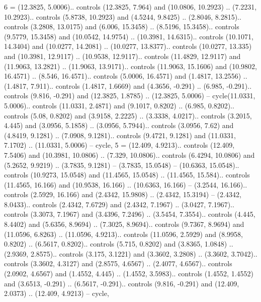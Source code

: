 {6} = {(12.3825, 5.0006).. controls (12.3825, 7.964) and (10.0806, 10.2923) .. (7.2231, 10.2923).. controls (5.8738, 10.2923) and (4.5244, 9.8425) .. (2.8046, 8.2815).. controls (3.2808, 13.0175) and (6.006, 15.3458) .. (8.5196, 15.3458).. controls (9.5779, 15.3458) and (10.0542, 14.9754) .. (10.3981, 14.6315).. controls (10.1071, 14.3404) and (10.0277, 14.2081) .. (10.0277, 13.8377).. controls (10.0277, 13.335) and (10.3981, 12.9117) .. (10.9538, 12.9117).. controls (11.4829, 12.9117) and (11.9063, 13.2821) .. (11.9063, 13.9171).. controls (11.9063, 15.1606) and (10.9802, 16.4571) .. (8.546, 16.4571).. controls (5.0006, 16.4571) and (1.4817, 13.2556) .. (1.4817, 7.911).. controls (1.4817, 1.6669) and (4.3656, -0.291) .. (6.985, -0.291).. controls (9.816, -0.291) and (12.3825, 1.8785) .. (12.3825, 5.0006) -- cycle(11.0331, 5.0006).. controls (11.0331, 2.4871) and (9.1017, 0.8202) .. (6.985, 0.8202).. controls (5.08, 0.8202) and (3.9158, 2.2225) .. (3.3338, 4.0217).. controls (3.2015, 4.445) and (3.0956, 5.1858) .. (3.0956, 5.7944).. controls (3.0956, 7.62) and (4.8419, 9.1281) .. (7.0908, 9.1281).. controls (9.4721, 9.1281) and (11.0331, 7.1702) .. (11.0331, 5.0006) -- cycle},
{5} = {(12.409, 4.9213).. controls (12.409, 7.5406) and (10.3981, 10.0806) .. (7.329, 10.0806).. controls (6.4294, 10.0806) and (5.2652, 9.9219) .. (3.7835, 9.1281) -- (3.7835, 15.0548) -- (10.6363, 15.0548).. controls (10.9273, 15.0548) and (11.4565, 15.0548) .. (11.4565, 15.584).. controls (11.4565, 16.166) and (10.9538, 16.166) .. (10.6363, 16.166) -- (3.2544, 16.166).. controls (2.5929, 16.166) and (2.4342, 15.9808) .. (2.4342, 15.3194) -- (2.4342, 8.0433).. controls (2.4342, 7.6729) and (2.4342, 7.1967) .. (3.0427, 7.1967).. controls (3.3073, 7.1967) and (3.4396, 7.2496) .. (3.5454, 7.3554).. controls (4.445, 8.4402) and (5.6356, 8.9694) .. (7.3025, 8.9694).. controls (9.7367, 8.9694) and (11.0596, 6.8263) .. (11.0596, 4.9213).. controls (11.0596, 2.5929) and (8.9958, 0.8202) .. (6.5617, 0.8202).. controls (5.715, 0.8202) and (3.8365, 1.0848) .. (2.9369, 2.8575).. controls (3.175, 3.1221) and (3.3602, 3.2808) .. (3.3602, 3.7042).. controls (3.3602, 4.3127) and (2.8575, 4.6567) .. (2.4077, 4.6567).. controls (2.0902, 4.6567) and (1.4552, 4.445) .. (1.4552, 3.5983).. controls (1.4552, 1.4552) and (3.6513, -0.291) .. (6.5617, -0.291).. controls (9.816, -0.291) and (12.409, 2.0373) .. (12.409, 4.9213) -- cycle},
